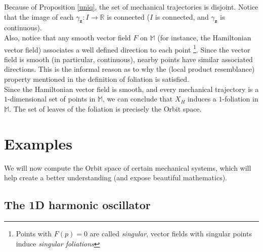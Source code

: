 \documentclass[12pt]{article}
\theoremstyle{plain}
\newcommand{\R}{\mathbb{R}}
\newcommand{\M}{\mathbb{M}}
\begin{document}
Because of Proposition \ref{uniq}, the set of mechanical trajectories is disjoint. Notice that the image of each $\gamma_\mathbf{z}\colon I\to\R$ is connected ($I$ is connected, and $\gamma_\mathbf{z}$ is continuous).\\

Also, notice that any smooth vector field $F$ on $\M$ (for instance, the Hamiltonian vector field) associates a well defined direction to each point \footnote{Points with $F(p) = 0$ are called \textit{singular}, vector fields with singular points induce \textit{singular foliations}}. Since the vector field is smooth (in particular, continuous), nearby points have similar associated directions. This is the informal reason as to why the (local product resemblance) property mentioned in the definition of foliation is satisfied.\\

Since the Hamiltonian vector field is smooth, and every mechanical trajectory is a $1$-dimensional set of points in $\M$, we can conclude that $X_H$ induces a $1$-foliation in $\M$. The set of leaves of the foliation is precisely the Orbit space.

\section{Examples}

We will now compute the Orbit space of certain mechanical systems, which will help create a better understanding (and expose beautiful mathematics).

\subsection{The 1D harmonic oscillator}
\end{document}
